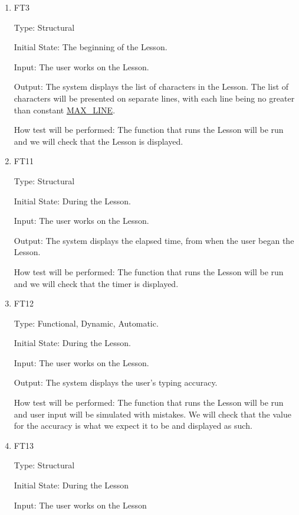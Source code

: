 \documentclass[12pt, titlepage]{article}
\begin{document}
\begin{enumerate}


\item{{\color{cyan}FT3}\\}

Type: Structural
					
Initial State: The beginning of the Lesson.
					
Input: The user works on the Lesson.
					
Output: The system displays the list of characters in the Lesson. The list of characters will be presented on separate lines, with each line being no greater than constant \hyperref[symbols]{MAX\_LINE}.

					
How test will be performed: The function that runs the Lesson will be run and we will check that the Lesson is displayed.

\item{{\color{cyan}FT11}\\}

Type: Structural
					
Initial State: During the Lesson.
					
Input: The user works on the Lesson.
					
Output: The system displays the elapsed time, from when the user began the Lesson.
					
How test will be performed:  The function that runs the Lesson will be run and we will check that the timer is displayed.

\item{{\color{cyan}FT12}\\}
{\color{cyan}
Type: Functional, Dynamic, Automatic.
					
Initial State: During the Lesson.
					
Input: The user works on the Lesson.
					
Output: The system displays the user's typing accuracy.
					
How test will be performed:  The function that runs the Lesson will be run and user input will be simulated with mistakes. We will check that the value for the accuracy is what we expect it to be and displayed as such.}
\item{{\color{cyan}FT13}\\}

Type: Structural
					
Initial State: During the Lesson
					
Input: The user works on the Lesson
					

\end{enumerate}
\end{document}
